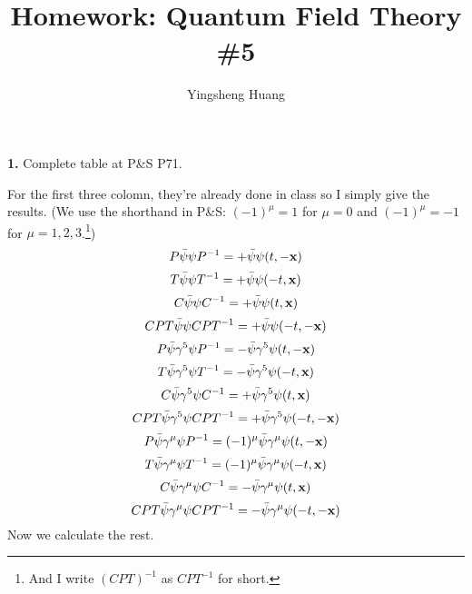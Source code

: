 \documentclass{article}
\title{Homework: Quantum Field Theory \#5}
\author{Yingsheng Huang}
\newcommand{\gm}{\gamma^{\mu}}
\newcommand{\g}{\gamma}
\begin{document}
\maketitle
{\bf1.}\quad
Complete table at P\&S P71.

For the first three colomn, they're already done in class so I simply give the results. (We use the shorthand in P\&S: $(-1)^{\mu}=1$ for $\mu=0$ and $(-1)^{\mu}=-1$ for $\mu=1,2,3$.\footnote{And I write $(CPT)^{-1}$ as $CPT^{-1}$ for short.})
$$P\bar\psi\psi P^{-1}=+\bar\psi\psi(t,-\vb{x})$$
$$T\bar\psi\psi T^{-1}=+\bar\psi\psi(-t,\vb{x})$$
$$C\bar\psi\psi C^{-1}=+\bar\psi\psi(t,\vb{x})$$
$$CPT\bar\psi\psi CPT^{-1}=+\bar\psi\psi(-t,-\vb{x})$$
$$P\bar\psi\g^5\psi P^{-1}=-\bar\psi\g^5\psi(t,-\vb{x})$$
$$T\bar\psi\g^5\psi T^{-1}=-\bar\psi\g^5\psi(-t,\vb{x})$$
$$C\bar\psi\g^5\psi C^{-1}=+\bar\psi\g^5\psi(t,\vb{x})$$
$$CPT\bar\psi\g^5\psi CPT^{-1}=+\bar\psi\g^5\psi(-t,-\vb{x})$$
$$P\bar\psi\gm\psi P^{-1}=(-1)^{\mu}\bar\psi\gm\psi(t,-\vb{x})$$
$$T\bar\psi\gm\psi T^{-1}=(-1)^{\mu}\bar\psi\gm\psi(-t,\vb{x})$$
$$C\bar\psi\gm\psi C^{-1}=-\bar\psi\gm\psi(t,\vb{x})$$
$$CPT\bar\psi\gm\psi CPT^{-1}=-\bar\psi\gm\psi(-t,-\vb{x})$$
Now we calculate the rest.
\end{document}
